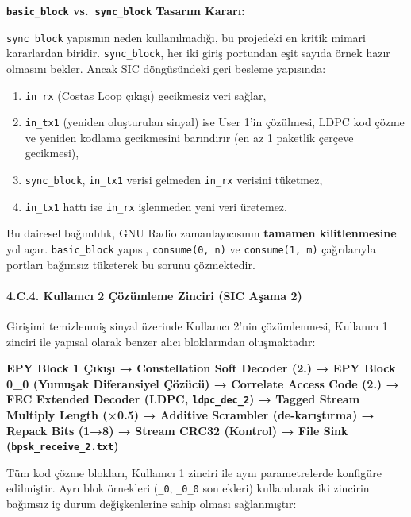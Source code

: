 \documentclass[
]{IEEEtran}
\providecommand{\tightlist}{%
  \setlength{\itemsep}{0pt}\setlength{\parskip}{0pt}}
\begin{document}
\textbf{\texttt{basic\_block} vs.~\texttt{sync\_block} Tasarım Kararı:}

\texttt{sync\_block} yapısının neden kullanılmadığı, bu projedeki en
kritik mimari kararlardan biridir. \texttt{sync\_block}, her iki giriş
portundan eşit sayıda örnek hazır olmasını bekler. Ancak SIC
döngüsündeki geri besleme yapısında:

\begin{enumerate}
\def\labelenumi{\arabic{enumi}.}
\tightlist
\item
  \texttt{in\_rx} (Costas Loop çıkışı) gecikmesiz veri sağlar,
\item
  \texttt{in\_tx1} (yeniden oluşturulan sinyal) ise User 1'in çözülmesi,
  LDPC kod çözme ve yeniden kodlama gecikmesini barındırır (en az 1
  paketlik çerçeve gecikmesi),
\item
  \texttt{sync\_block}, \texttt{in\_tx1} verisi gelmeden \texttt{in\_rx}
  verisini tüketmez,
\item
  \texttt{in\_tx1} hattı ise \texttt{in\_rx} işlenmeden yeni veri
  üretemez.
\end{enumerate}

Bu dairesel bağımlılık, GNU Radio zamanlayıcısının \textbf{tamamen
kilitlenmesine} yol açar. \texttt{basic\_block} yapısı,
\texttt{consume(0,\ n)} ve \texttt{consume(1,\ m)} çağrılarıyla portları
bağımsız tüketerek bu sorunu çözmektedir.

\paragraph{4.C.4. Kullanıcı 2 Çözümleme Zinciri (SIC Aşama
2)}\label{c.4.-kullanux131cux131-2-uxe7uxf6zuxfcmleme-zinciri-sic-aux15fama-2}

Girişimi temizlenmiş sinyal üzerinde Kullanıcı 2'nin çözümlenmesi,
Kullanıcı 1 zinciri ile yapısal olarak benzer alıcı bloklarından
oluşmaktadır:

\textbf{EPY Block 1 Çıkışı → Constellation Soft Decoder (2.) → EPY Block
0\_0 (Yumuşak Diferansiyel Çözücü) → Correlate Access Code (2.) → FEC
Extended Decoder (LDPC, \texttt{ldpc\_dec\_2}) → Tagged Stream Multiply
Length (×0.5) → Additive Scrambler (de-karıştırma) → Repack Bits (1→8) →
Stream CRC32 (Kontrol) → File Sink (\texttt{bpsk\_receive\_2.txt})}

Tüm kod çözme blokları, Kullanıcı 1 zinciri ile aynı parametrelerde
konfigüre edilmiştir. Ayrı blok örnekleri (\texttt{\_0}, \texttt{\_0\_0}
son ekleri) kullanılarak iki zincirin bağımsız iç durum değişkenlerine
sahip olması sağlanmıştır:
\end{document}

